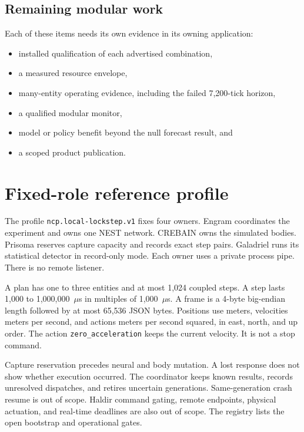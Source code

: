 \documentclass[11pt,a4paper]{article}
\theoremstyle{definition}
\let\NcpTextttBase\texttt
\renewcommand{\texttt}[1]{\mbox{\NcpTextttBase{#1}}}
\begin{document}
\subsection{Remaining modular work}

Each of these items needs its own evidence in its owning application:
\begin{itemize}[leftmargin=*]
  \item installed qualification of each advertised combination,
  \item a measured resource envelope,
  \item many-entity operating evidence, including the failed 7,200-tick horizon,
  \item a qualified modular monitor,
  \item model or policy benefit beyond the null forecast result, and
  \item a scoped product publication.
\end{itemize}

\section{Fixed-role reference profile}


The profile \texttt{ncp.local-lockstep.v1} fixes four owners. Engram coordinates the
experiment and owns one NEST network. CREBAIN owns the simulated bodies. Prisoma
reserves capture capacity and records exact step pairs. Galadriel runs its statistical
detector in record-only mode. Each owner uses a private process pipe. There is no
remote listener.

A plan has one to three entities and at most 1,024 coupled steps. A step lasts
1,000 to 1,000,000~$\mu$s in multiples of 1,000~$\mu$s. A frame is a 4-byte big-endian
length followed by at most 65,536 JSON bytes. Positions use meters, velocities meters
per second, and actions meters per second squared, in east, north, and up order. The
action \texttt{zero\_acceleration} keeps the current velocity. It is not a stop
command.

Capture reservation precedes neural and body mutation. A lost response does not show
whether execution occurred. The coordinator keeps known results, records unresolved
dispatches, and retires uncertain generations. Same-generation crash resume is out of
scope. Haldir command gating, remote endpoints, physical actuation, and real-time
deadlines are also out of scope. The registry  lists
the open bootstrap and operational gates.
\end{document}

